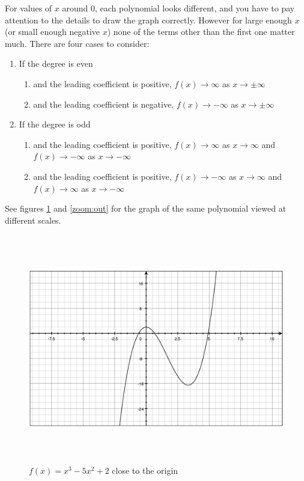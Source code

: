\documentclass[fleqn,addpoints]{exam}
\begin{document}
For values of $x$ around 0, each polynomial looks different, and you have to pay attention to the details to draw the
graph correctly.  However for large enough $x$ (or small enough negative $x$) none of the terms other than the first one
matter much.  There are four cases to consider:
\begin{enumerate}

\item If the degree is even
\begin{enumerate}
\item and the leading coefficient is positive, $f(x) \rightarrow \infty$ as $x \rightarrow \pm \infty$
\item and the leading coefficient is negative, $f(x) \rightarrow -\infty$ as $x \rightarrow \pm \infty$
\end{enumerate}

\item If the degree is odd
\begin{enumerate}
\item and the leading coefficient is positive, $f(x) \rightarrow \infty$ as $x \rightarrow \infty$ and $f(x) \rightarrow
  -\infty$ as $x \rightarrow -\infty$
\item and the leading coefficient is positive, $f(x) \rightarrow -\infty$ as $x \rightarrow \infty$ and $f(x)
  \rightarrow \infty$ as $x \rightarrow -\infty$ 
\end{enumerate}
\end{enumerate}

See figures \ref{zoom:in} and \ref{zoom:out} for the graph of the same polynomial viewed at different scales.

\begin{figure}[H]
  \centering
  \includegraphics[width=14cm,height=10cm]{zoom_in.eps}
  \caption{$f(x) = x^3-5x^2+2$ close to the origin}
  \label{zoom:in}
\end{figure}
\end{document}
